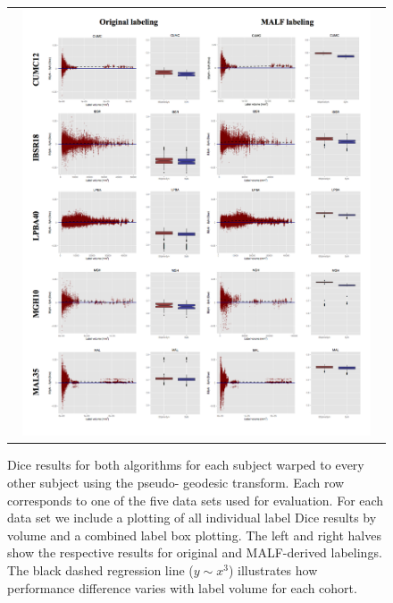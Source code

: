 \documentclass{frontiersSCNS}
\begin{document}
\begin{figure}[htb]
  \centering
  \begin{tabular}{c}
  \includegraphics[width=0.95\textwidth]{evaluation2.jpg}
  \end{tabular}
  \caption{Dice results for both algorithms for 
  each subject warped to every other subject using the pseudo-
  geodesic transform.  Each 
  row corresponds to one of the five data sets used for evaluation.
  For each data set we include a plotting of all individual label 
  Dice results by volume and a combined label box plotting.  The
  left and right halves show the respective results for 
  original and MALF-derived labelings.  The black dashed regression line
  ($y \sim x^3$) illustrates how performance difference varies with label volume for
  each cohort.
  }
  \label{fig:dice}
\end{figure}  
\end{document}
